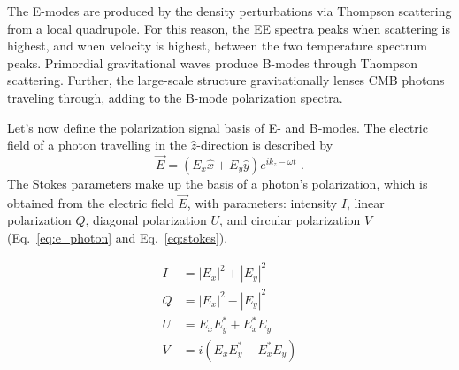 The E-modes are produced by the density perturbations via Thompson scattering from a local quadrupole.  For this reason, the EE spectra peaks when scattering is highest, and when velocity is highest, between the two temperature spectrum peaks.  Primordial gravitational waves produce B-modes through Thompson scattering.  Further, the large-scale structure gravitationally lenses CMB photons traveling through, adding to the B-mode polarization spectra.

Let's now define the polarization signal basis of E- and B-modes.  The electric field of a photon travelling in the $\hat{z}$-direction is described by
\begin{equation}
    \Vec{E} = (E_x\hat{x} + E_y\hat{y})e^{i k_z - \omega t } \text{ .}
    \label{eq:e_photon}
\end{equation}
The Stokes parameters make up the basis of a photon's polarization, which is obtained from the electric field $\Vec{E}$, with parameters: intensity $I$, linear polarization $Q$, diagonal polarization $U$, and circular polarization $V$ (Eq.~\ref{eq:e_photon} and Eq.~\ref{eq:stokes}).

\begin{equation}
\begin{split}
    I & = |E_x|^2 + |E_y|^2 \\
    Q & = |E_x|^2 - |E_y|^2 \\
    U & = E_x E_y^* + E_x^*E_y\\
    V & = i(E_x E_y^* - E_x^*E_y) \\
\end{split}
\label{eq:stokes}
\end{equation}


